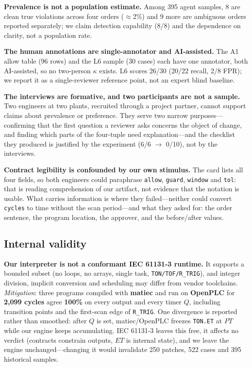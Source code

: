 \documentclass[acmsmall,screen,review,anonymous]{acmart}
\begin{document}
\textbf{Prevalence is not a population estimate.} Among 395 agent samples, 8 are clean true violations across four orders ($\approx$2\%) and 9 more are ambiguous orders reported separately; we claim detection capability (8/8) and the dependence on clarity, not a population rate.

\textbf{The human annotations are single-annotator and AI-assisted.} The A1 allow table (96 rows) and the L6 sample (30 cases) each have one annotator, both AI-assisted, so no two-person $\kappa$ exists. L6 scores 26/30 (20/22 recall, 2/8 FPR); we report it as a single-reviewer reference point, not an expert blind baseline.

\textbf{The interviews are formative, and two participants are not a sample.} Two engineers at two plants, recruited through a project partner, cannot support claims about prevalence or preference. They serve two narrow purposes---confirming that the first question a reviewer asks concerns the object of change, and finding which parts of the four-tuple need explanation---and the checklist they produced is justified by the experiment (6/6 $\to$ 0/10), not by the interviews.

\textbf{Contract legibility is confounded by our own stimulus.} The card lists all four fields, so both engineers could paraphrase \texttt{allow}, \texttt{guard}, \texttt{window} and \texttt{tol}: that is reading comprehension of our artifact, not evidence that the notation is usable. What carries information is where they failed---neither could convert \texttt{cycles} to time without the scan period---and what they asked for: the order sentence, the program location, the approver, and the before/after values.

\subsection{Internal validity}

\textbf{Our interpreter is not a conformant IEC 61131-3 runtime.} It supports a bounded subset (no loops, no arrays, single task, \texttt{TON/TOF/R\_TRIG}), and integer division, implicit conversion and scheduling may differ from vendor toolchains. \emph{Mitigation}: three programs compiled with \textbf{matiec} and run on \textbf{OpenPLC} for \textbf{2,099 cycles} agree \textbf{100\%} on every output and every timer $Q$, including transition points and the first-scan edge of \texttt{R\_TRIG}. One divergence is reported rather than smoothed: after $Q$ is set, matiec/OpenPLC freezes \texttt{TON.ET} at $PT$ while our engine keeps accumulating. IEC 61131-3 leaves this free, it affects no verdict (contracts constrain outputs, $ET$ is internal state), and we leave the engine unchanged---changing it would invalidate 250 patches, 522 cases and 395 historical samples.
\end{document}
